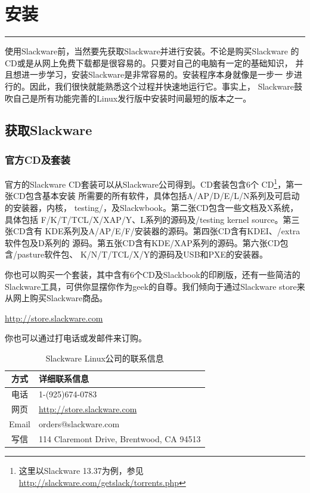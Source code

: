 
\chapter{安装}
\label{chap:installation}

\begin{flushleft}
\rule[0mm]{\textwidth}{.1pt}
\end{flushleft}

使用Slackware前，当然要先获取Slackware并进行安装。不论是购买Slackware
的CD或是从网上免费下载都是很容易的。只要对自己的电脑有一定的基础知识，
并且想进一步学习，安装Slackware是非常容易的。安装程序本身就像是一步一
步进行的。因此，我们很快就能熟悉这个过程并快速地运行它。事实上，
Slackware鼓吹自己是所有功能完善的Linux发行版中安装时间最短的版本之一。

\section{获取Slackware}
\label{sec:installation:gettingSlackware}

\subsection{官方CD及套装}
\label{sec:installation:gettingSlackware:official}

官方的Slackware CD套装可以从Slackware公司得到。CD套装包含6个
CD\footnote{这里以Slackware 13.37为例，参见
\url{http://slackware.com/getslack/torrents.php}}，第一张CD包含基本安装
所需要的所有软件，具体包括A/AP/D/E/L/N系列及可启动的安装器，内核，
testing/，及Slackwbook。第二张CD包含一些文档及X系统，具体包括
F/K/T/TCL/X/XAP/Y、L系列的源码及/testing kernel source。第三张CD含有
KDE系列及A/AP/E/F/安装器的源码。第四张CD含有KDEI、/extra软件包及D系列的
源码。第五张CD含有KDE/XAP系列的源码。第六张CD包含/pasture软件包、
K/N/T/TCL/X/Y的源码及USB和PXE的安装器。

你也可以购买一个套装，其中含有6个CD及Slackbook的印刷版，还有一些简洁的
Slackware工具，可供你显摆你作为geek的自尊。我们倾向于通过Slackware
store来从网上购买Slackware商品。

\url{http://store.slackware.com}

你也可以通过打电话或发邮件来订购。

\begin{table}[htpb]
  \centering
  \begin{tabular}{c|l}
    \hline\hline 
  方式 & 详细联系信息  \\ \hline
  电话 & 1-(925)674-0783 \\
  网页 & \url{http://store.slackware.com} \\
  Email & orders@slackware.com \\
  写信 & 114 Claremont Drive, Brentwood, CA 94513 \\
  \hline \hline
  \end{tabular}
  \caption{Slackware Linux公司的联系信息}
  \label{tab:slackwareLinuxIncContactInformation}
\end{table}


